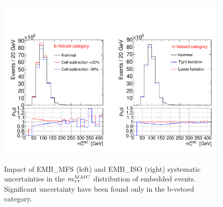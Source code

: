 \begin{figure}[tp]
	\begin{center}
	\includegraphics[width=0.49\textwidth]{figure/systematics/emb_sys_veto_MFS.pdf}
	\includegraphics[width=0.49\textwidth]{figure/systematics/emb_sys_veto_iso.pdf}
	\end{center}
	\caption{Impact of EMB\_MFS (left) and EMB\_ISO (right) systematic uncertainties in the $m_{\tau\tau}^{MMC}$ distribution of  embedded events.
	Significant uncertainty have been found only in the b-vetoed category.}
	\label{fig:EMBMFS}
\end{figure}

%
%	
%

